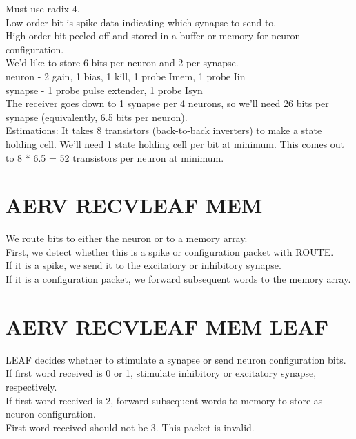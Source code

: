 \documentclass{article}
\begin{document}
Must use radix 4. \\
Low order bit is spike data indicating which synapse to send to. \\
High order bit peeled off and stored in a buffer or memory for neuron configuration. \\

\noindent
We'd like to store 6 bits per neuron and 2 per synapse. \\
neuron - 2 gain, 1 bias, 1 kill, 1 probe Imem, 1 probe Iin \\
synapse - 1 probe pulse extender, 1 probe Isyn \\
The receiver goes down to 1 synapse per 4 neurons, so we'll need 26 bits per synapse (equivalently, 6.5 bits per neuron). \\

\noindent
Estimations: It takes 8 transistors (back-to-back inverters) to make a state holding cell. We'll need 1 state holding cell per bit at minimum. This comes out to 8 * 6.5 = 52 transistors per neuron at minimum.

\section{AERV RECVLEAF MEM \label{sec:RECV_LEAF_MEM}}

We route bits to either the neuron or to a memory array. \\
First, we detect whether this is a spike or configuration packet with ROUTE. \\
If it is a spike, we send it to the excitatory or inhibitory synapse. \\
If it is a configuration packet, we forward subsequent words to the memory array.

\section{AERV RECVLEAF MEM LEAF \label{sec:RECV_LEAF_MEM_LEAF}}

LEAF decides whether to stimulate a synapse or send neuron configuration bits. \\
If first word received is 0 or 1, stimulate inhibitory or excitatory synapse, respectively. \\
If first word received is 2, forward subsequent words to memory to store as neuron configuration. \\
First word received should not be 3. This packet is invalid. \\
\end{document}
